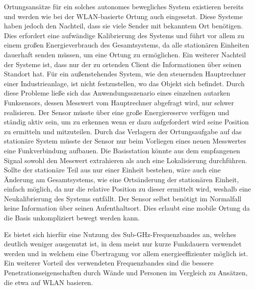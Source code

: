 Ortungsansätze für ein solches autonomes bewegliches System existieren bereits und werden wie bei der WLAN-basierte Ortung auch eingesetzt. Diese Systeme haben jedoch den Nachteil, dass sie viele Sender mit bekanntem Ort benötigen. Dies erfordert eine aufwändige Kalibrierung des Systems und führt vor allem zu einem großen Energieverbrauch des Gesamtsystems, da alle stationären Einheiten dauerhaft senden müssen, um eine Ortung zu ermöglichen.
Ein weiterer Nachteil der Systeme ist, dass nur der zu ortenden Client die Informationen über seinen Standort hat. Für ein außenstehendes System, wie den steuernden Hauptrechner einer Industrieanlage, ist nicht festzustellen, wo das Objekt sich befindet. 
Durch diese Probleme ließe sich das Anwendungsszenario eines einzelnen autarken Funksensors, dessen Messwert vom Hauptrechner abgefragt wird, nur schwer realisieren. Der Sensor müsste über eine große Energiereserve verfügen und ständig aktiv sein, um zu erkennen wenn er dazu aufgefordert wird seine Position zu ermitteln und mitzuteilen.
Durch das Verlagern der Ortungsaufgabe auf das stationäre System müsste der Sensor nur beim Vorliegen eines neuen Messwertes eine Funkverbindung aufbauen. Die Basisstation könnte aus dem empfangenen Signal sowohl den Messwert extrahieren als auch eine Lokalisierung durchführen.
Sollte der stationäre Teil  aus nur einer Einheit bestehen, wäre auch eine Änderung am Gesamtsystems, wie eine Ortsänderung der stationären Einheit, einfach möglich, da nur die relative Position zu dieser ermittelt wird, weshalb eine Neukalibrierung des Systems entfällt. Der Sensor selbst benötigt im Normalfall keine Information über seinen Aufenthaltsort. Dies erlaubt eine mobile Ortung da die Basis unkompliziert bewegt werden kann.


Es bietet sich hierfür eine Nutzung des Sub-GHz-Frequenzbandes an, welches deutlich weniger ausgenutzt ist, in dem meist nur kurze Funkdauern verwendet werden und in welchem eine Übertragung vor allem energieeffizienter möglich ist\cite{SabolcikGHzoderSub}.
Ein weiterer Vorteil des verwendeten Frequenzbandes sind die bessere Penetrationseigenschaften durch Wände und Personen im Vergleich zu Ansätzen, die etwa auf WLAN basieren.


